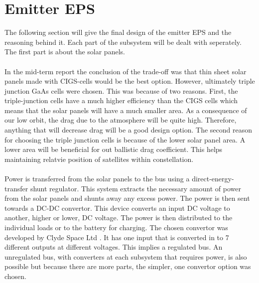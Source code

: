 \section{Emitter EPS}
\label{emitter_EPS}

The following section will give the final design of the emitter EPS and the reasoning behind it.
Each part of the subsystem will be dealt with seperately. The first part is about the solar panels.
\\\\
In the mid-term report the conclusion of the trade-off was that thin sheet solar panels made with CIGS-cells would be the best option. However, ultimately triple junction GaAs cells were chosen. This was because of two reasons. First, the triple-junction cells have a much higher efficiency than the CIGS cells which means that the solar panels will have a much smaller area. As a consequence of our low orbit, the drag due to the atmosphere will be quite high. Therefore, anything that will decrease drag will be a good design option. The second reason for choosing the triple junction cells is because of the lower solar panel area. A lower area will be beneficial for out ballistic drag coefficient. This helps maintaining relatvie position of satellites within constellation.
\\\\
Power is transferred from the solar panels to the bus using a direct-energy-transfer shunt regulator. This system extracts the necessary amount of power from the solar panels and shunts away any excess power. The power is then sent towards a DC-DC convertor. This device converts an input DC voltage to another, higher or lower, DC voltage. The power is then distributed to the individual loads or to the battery for charging. The chosen convertor was developed by Clyde Space Ltd \cite{ClydeSpace}. It has one input that is converted in to 7 different outputs at different voltages. This implies a regulated bus. An unregulated bus, with converters at each subsystem that requires power, is also possible but because there are more parts, the simpler, one convertor option was chosen.
\\\\
